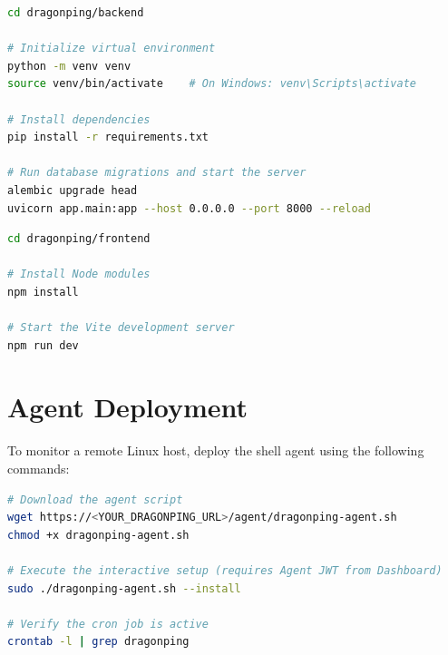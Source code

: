 \documentclass[12pt,a4paper,oneside]{report}
\begin{document}
\begin{lstlisting}[language=bash, caption={Backend Setup}, label={lst:backend_setup}]
cd dragonping/backend

# Initialize virtual environment
python -m venv venv
source venv/bin/activate    # On Windows: venv\Scripts\activate

# Install dependencies
pip install -r requirements.txt

# Run database migrations and start the server
alembic upgrade head
uvicorn app.main:app --host 0.0.0.0 --port 8000 --reload
\end{lstlisting}

\begin{lstlisting}[language=bash, caption={Frontend Setup}, label={lst:frontend_setup}]
cd dragonping/frontend

# Install Node modules
npm install

# Start the Vite development server
npm run dev
\end{lstlisting}

\section*{Agent Deployment}
\noindent To monitor a remote Linux host, deploy the shell agent using the following commands:

\begin{lstlisting}[language=bash, caption={Agent Installation}, label={lst:agent_setup}]
# Download the agent script
wget https://<YOUR_DRAGONPING_URL>/agent/dragonping-agent.sh
chmod +x dragonping-agent.sh

# Execute the interactive setup (requires Agent JWT from Dashboard)
sudo ./dragonping-agent.sh --install

# Verify the cron job is active
crontab -l | grep dragonping
\end{lstlisting}
\end{document}
